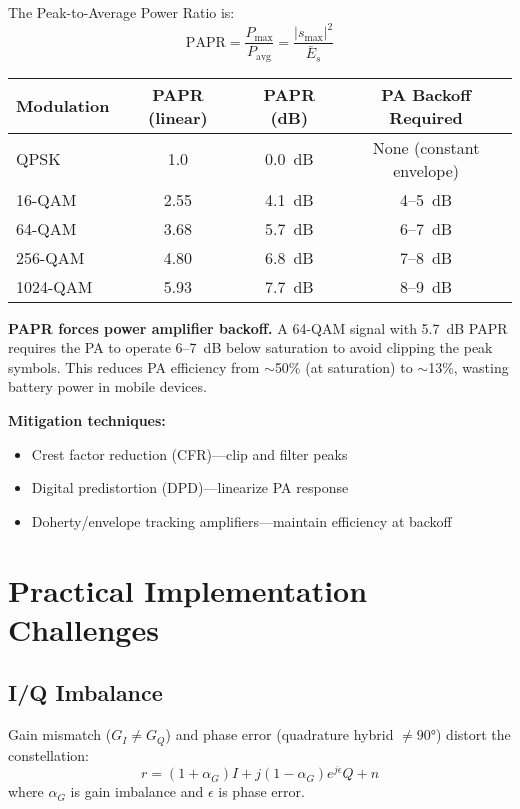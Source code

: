 The Peak-to-Average Power Ratio is:
\begin{equation}
\mathrm{PAPR} = \frac{P_{\max}}{P_{\text{avg}}} = \frac{|s_{\max}|^2}{\bar{E}_s}
\label{eq:qam-papr}
\end{equation}

\begin{center}
\begin{tabular}{@{}lccc@{}}
\toprule
Modulation & PAPR (linear) & PAPR (dB) & PA Backoff Required \\
\midrule
QPSK & 1.0 & 0.0~dB & None (constant envelope) \\
16-QAM & 2.55 & 4.1~dB & 4--5~dB \\
64-QAM & 3.68 & 5.7~dB & 6--7~dB \\
256-QAM & 4.80 & 6.8~dB & 7--8~dB \\
1024-QAM & 5.93 & 7.7~dB & 8--9~dB \\
\bottomrule
\end{tabular}
\end{center}

\begin{warningbox}
\textbf{PAPR forces power amplifier backoff.} A 64-QAM signal with 5.7~dB PAPR requires the PA to operate 6--7~dB below saturation to avoid clipping the peak symbols. This reduces PA efficiency from $\sim$50\% (at saturation) to $\sim$13\%, wasting battery power in mobile devices.

\textbf{Mitigation techniques:}
\begin{itemize}
\item Crest factor reduction (CFR)---clip and filter peaks
\item Digital predistortion (DPD)---linearize PA response
\item Doherty/envelope tracking amplifiers---maintain efficiency at backoff
\end{itemize}
\end{warningbox}

\section{Practical Implementation Challenges}

\subsection{I/Q Imbalance}

Gain mismatch ($G_I \neq G_Q$) and phase error (quadrature hybrid $\neq 90°$) distort the constellation:
\begin{equation}
r = (1 + \alpha_G) I + j(1 - \alpha_G) e^{j\epsilon} Q + n
\end{equation}
where $\alpha_G$ is gain imbalance and $\epsilon$ is phase error.

